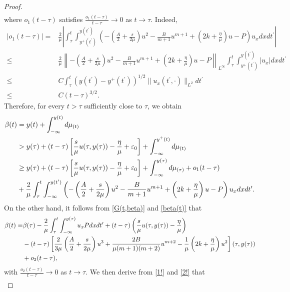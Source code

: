 \documentclass[10pt]{article}
\numberwithin{equation}{section}
\begin{document}
\begin{proof}
\begin{align*}
		\end{align*}
		where $o_1(t-\tau)$ satisfies $\frac{o_{1}(t-\tau)}{t-\tau}\to0$ as $t\to\tau$. Indeed, 
		\begin{align*}
			|o_{1}(t-\tau)|=&\frac{2}{\mu}\left|\int_{\tau}^{t}\int_{y^{+}(t^\prime)}^{y(t^\prime)}\left(-\left(\frac{A}{2}+\frac{s}{2\mu}\right)u^2-\frac{B}{m+1}u^{m+1}+\left(2k+\frac{\eta}{\mu}\right)u-P\right)u_xdxdt^\prime\right|\\
			\leq&\frac{2}{\mu}\left\|-\left(\frac{A}{2}+\frac{s}{2\mu}\right)u^2-\frac{B}{m+1}u^{m+1}+\left(2k+\frac{\eta}{\mu}\right)u-P\right\|_{L^\infty}\int_{\tau}^{t}\int_{y^{+}(t^\prime)}^{y(t^\prime)}|u_{x}|dxdt^\prime \\
			\leq&C\int_{\tau}^{t}(y(t^\prime)-y^{+}(t^\prime))^{1/2}\|u_{x}(t^\prime,\cdot)\|_{L^{2}}dt^\prime\\
			\leq&C(t-\tau)^{3/2}.
		\end{align*}
		Therefore, for every $t>\tau$ sufficiently close to $\tau$, we obtain
		\begin{align}
			\beta(t) & =y(t)+\int_{-\infty}^{y(t)}d\mu_{(t)}\notag \\
			& > y(\tau)+(t-\tau)\left[\frac{s}{\mu}u(\tau,y(\tau))-\frac{\eta}{\mu}+\varepsilon_0\right]+\int_{-\infty}^{y^{+}(t)}d\mu_{(t)}\notag \\
			& \geq y(\tau)+(t-\tau)\left[\frac{s}{\mu}u(\tau,y(\tau))-\frac{\eta}{\mu}+\varepsilon_0\right]+\int_{-\infty}^{y(\tau)}d\mu_{(\tau)}+o_1(t-\tau)\notag\\
			&+\frac{2}{\mu}\int_{\tau}^{t}\int_{-\infty}^{y(t^\prime)}\left(-\left(\frac{A}{2}+\frac{s}{2\mu}\right)u^2-\frac{B}{m+1}u^{m+1}+\left(2k+\frac{\eta}{\mu}\right)u-P\right)u_xdxdt^\prime.\label{1!}
		\end{align}
		On the other hand, it follows from \eqref{G(t,beta)} and \eqref{beta(t)} that
		\begin{align}
			\beta(t)=&\beta(\tau)-\frac{2}{\mu}\int_{\tau}^{t}\int_{-\infty}^{y(\tau)}u_xPdxdt^\prime+(t-\tau)\left(\frac{s}{\mu}u(\tau,y(\tau))-\frac{\eta}{\mu}\right)\notag\\
			&-(t-\tau)\left[\frac{2}{3\mu}\left(\frac{A}{2}+\frac{s}{2\mu}\right)u^3+\frac{2B}{\mu(m+1)(m+2)}u^{m+2}-\frac{1}{\mu}\left(2k+\frac{\eta}{\mu}\right)u^{2}\right](\tau,y(\tau))\notag\\
			&+o_2(t-\tau),\label{2!}
		\end{align}
		with $\frac{o_{2}(t-\tau)}{t-\tau}\to0$ as $t\to\tau$. We then derive from \eqref{1!} and \eqref{2!} that
		\begin{align*}

\end{align*}
\end{proof}
\end{document}
